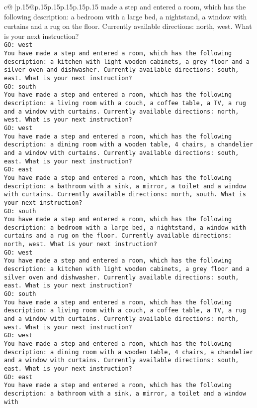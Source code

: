 \documentclass{article}
\begin{document}
{\begin{supertabular}{c@{$\;$}|p{.15\linewidth}@{}p{.15\linewidth}p{.15\linewidth}p{.15\linewidth}p{.15\linewidth}p{.15\linewidth}}
{{{made a step and entered a room, which has the following description: a bedroom with a large bed, a nightstand, a window with curtains and a rug on the floor. Currently available directions: north, west. What is your next instruction?\\ \tt GO: west\\ \tt You have made a step and entered a room, which has the following description: a kitchen with light wooden cabinets, a grey floor and a silver oven and dishwasher. Currently available directions: south, east. What is your next instruction?\\ \tt GO: south\\ \tt You have made a step and entered a room, which has the following description: a living room with a couch, a coffee table, a TV, a rug and a window with curtains. Currently available directions: north, west. What is your next instruction?\\ \tt GO: west\\ \tt You have made a step and entered a room, which has the following description: a dining room with a wooden table, 4 chairs, a chandelier and a window with curtains. Currently available directions: south, east. What is your next instruction?\\ \tt GO: east\\ \tt You have made a step and entered a room, which has the following description: a bathroom with a sink, a mirror, a toilet and a window with curtains. Currently available directions: north, south. What is your next instruction?\\ \tt GO: south\\ \tt You have made a step and entered a room, which has the following description: a bedroom with a large bed, a nightstand, a window with curtains and a rug on the floor. Currently available directions: north, west. What is your next instruction?\\ \tt GO: west\\ \tt You have made a step and entered a room, which has the following description: a kitchen with light wooden cabinets, a grey floor and a silver oven and dishwasher. Currently available directions: south, east. What is your next instruction?\\ \tt GO: south\\ \tt You have made a step and entered a room, which has the following description: a living room with a couch, a coffee table, a TV, a rug and a window with curtains. Currently available directions: north, west. What is your next instruction?\\ \tt GO: west\\ \tt You have made a step and entered a room, which has the following description: a dining room with a wooden table, 4 chairs, a chandelier and a window with curtains. Currently available directions: south, east. What is your next instruction?\\ \tt GO: east\\ \tt You have made a step and entered a room, which has the following description: a bathroom with a sink, a mirror, a toilet and a window with }}}
\end{supertabular}}
\end{document}
